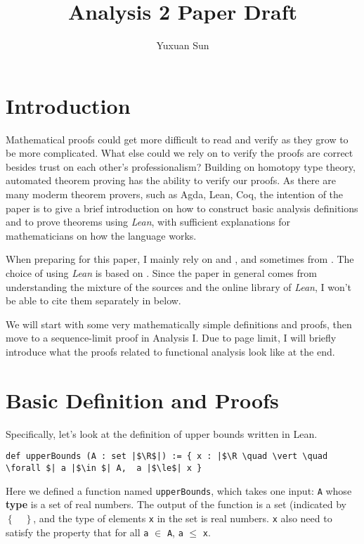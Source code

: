 \documentclass[a4paper]{article}
\title{Analysis 2 Paper Draft}
\author{Yuxuan Sun}
\newcommand{\R}{\mathbb{R}}
\begin{document}
\maketitle
\tableofcontents

\section{Introduction}
Mathematical proofs could get more difficult to read and verify as they grow to be more complicated. What else could we rely on to verify the proofs are correct besides trust on each other's professionalism? Building on homotopy type theory, automated theorem proving has the ability to verify our proofs. As there are many moderm theorem provers, such as Agda, Lean, Coq, the intention of the paper is to give a brief introduction on how to construct basic analysis definitions and to prove theorems using \textit{Lean}, with sufficient explanations for mathematicians on how the language works.

When preparing for this paper, I mainly rely on \cite{Avigad2016} and \cite{homotopy}, and sometimes from \cite{affeldt}. The choice of using \textit{Lean} is based on \cite{boldo}. Since the paper in general comes from understanding the mixture of the sources and the online library of \textit{Lean}, I won't be able to cite them separately in below.

We will start with some very mathematically simple definitions and proofs, then move to a sequence-limit proof in Analysis I. Due to page limit, I will briefly introduce what the proofs related to functional analysis look like at the end.

\section{Basic Definition and Proofs}

Specifically, let's look at the definition of upper bounds written in Lean.

\begin{listing}[!ht]
\begin{verbatim}
def upperBounds (A : set |$\R$|) := { x : |$\R \quad \vert \quad  \forall $| a |$\in $| A,  a |$\le$| x }
\end{verbatim}
\end{listing}

Here we defined a function named \texttt{upperBounds}, which takes one input: \texttt{A} whose \textbf{type} is a set of real numbers. The output of the function is a set (indicated by $\left\{ \quad \right\} $, and the type of elements \texttt{x} in the set is real numbers.  \texttt{x}  also need to satisfy the property that for all \texttt{a} $\in $ \texttt{A}, \texttt{a} $\le $ \texttt{x}.
\end{document}
